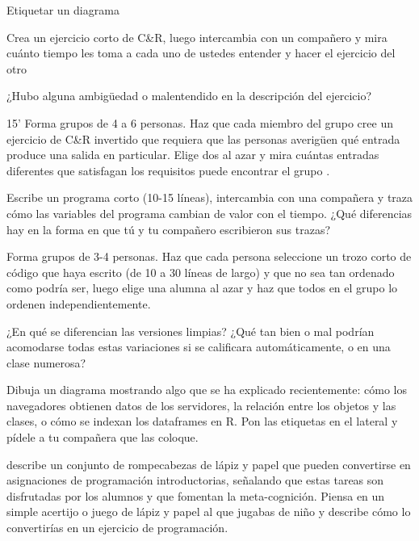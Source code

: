 \begin{aside}{Etiquetar un diagrama}
{

Crea un ejercicio corto de C&R, 
luego intercambia con un compañero 
y mira cuánto tiempo les toma a cada uno de ustedes entender y hacer el ejercicio del otro

¿Hubo alguna ambigüedad o malentendido en la descripción del ejercicio?

}{15’}
Forma grupos de 4 a 6 personas.
Haz que cada miembro del grupo cree un ejercicio de C\&R invertido que requiera que las personas averigüen qué entrada produce una salida en particular.
Elige dos al azar 
y mira cuántas entradas diferentes que satisfagan los requisitos puede encontrar el grupo .

Escribe un programa corto (10-15 líneas),
intercambia con una compañera y 
traza cómo las variables del programa cambian de valor con el tiempo.
¿Qué diferencias hay en la forma en que tú y tu compañero escribieron sus trazas?

Forma grupos de 3-4 personas.
Haz que cada persona seleccione un trozo corto de código que haya escrito  (de 10 a 30 líneas de largo) y que no sea tan ordenado como podría ser, 
luego elige una alumna al azar y haz que todos en el grupo lo ordenen independientemente.

¿En qué se diferencian las versiones limpias?
¿Qué tan bien o mal podrían acomodarse todas estas variaciones si se calificara automáticamente, o en una clase numerosa?

Dibuja un diagrama mostrando algo que se ha explicado recientemente: cómo los navegadores obtienen datos de los servidores, la relación entre los objetos y las clases,
o cómo se indexan los dataframes en R.
Pon las etiquetas en el lateral y pídele a tu compañera que las coloque.

\cite{Butl2017} describe un conjunto de rompecabezas de lápiz y papel que pueden convertirse en asignaciones de programación introductorias, señalando que estas tareas son disfrutadas por los alumnos y que fomentan la meta-cognición.
Piensa en un simple acertijo o juego de lápiz y papel al que jugabas de niño 
y describe cómo lo convertirías en un ejercicio de programación.


\end{aside}
